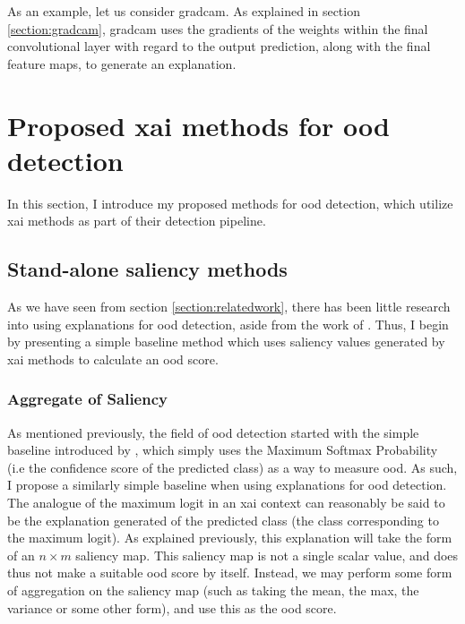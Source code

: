\documentclass[UKenglish]{uiomasterthesis} %
\theoremstyle{definition}
\begin{document}
As an example, let us consider \ac{gradcam}. As explained in section \ref{section:gradcam}, \ac{gradcam} uses the gradients of the weights within the final convolutional layer with regard to the output prediction, along with the final feature maps, to generate an explanation.

\section{Proposed \ac{xai} methods for \ac{ood} detection}

In this section, I introduce my proposed methods for \ac{ood} detection, which utilize \ac{xai} methods as part of their detection pipeline.

\subsection{Stand-alone saliency methods}

As we have seen from section \ref{section:relatedwork}, there has been little research into using explanations for \ac{ood} detection, aside from the work of \cite{martinez}. Thus, I begin by presenting a simple baseline method which uses saliency values generated by \ac{xai} methods to calculate an \ac{ood} score.

\subsubsection{Aggregate of Saliency}

As mentioned previously, the field of \ac{ood} detection started with the simple baseline introduced by \cite{oodbaseline}, which simply uses the Maximum Softmax Probability (i.e the confidence score of the predicted class) as a way to measure \ac{ood}. As such, I propose a similarly simple baseline when using explanations for \ac{ood} detection. The analogue of the maximum logit in an \ac{xai} context can reasonably be said to be the explanation generated of the predicted class (the class corresponding to the maximum logit). As explained previously, this explanation will take the form of an $n \times m$ saliency map. This saliency map is not a single scalar value, and does thus not make a suitable \ac{ood} score by itself. Instead, we may perform some form of aggregation on the saliency map (such as taking the mean, the max, the variance or some other form), and use this as the \ac{ood} score.
\end{document}
